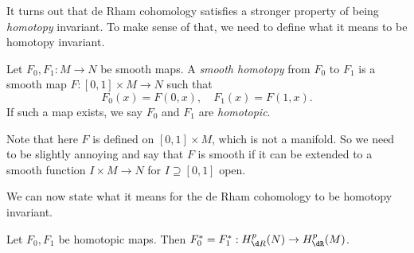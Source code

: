 \documentclass[a4paper]{article}
\begin{document}
It turns out that de Rham cohomology satisfies a stronger property of being \emph{homotopy} invariant. To make sense of that, we need to define what it means to be homotopy invariant.
\begin{defi}
  Let $F_0, F_1: M \to N$ be smooth maps. A \emph{smooth homotopy} from $F_0$ to $F_1$ is a smooth map $F: [0, 1] \times M \to N$ such that
  \[
    F_0(x) = F(0, x),\quad F_1(x) = F(1, x).
  \]
  If such a map exists, we say $F_0$ and $F_1$ are \emph{homotopic}.
\end{defi}
Note that here $F$ is defined on $[0, 1] \times M$, which is not a manifold. So we need to be slightly annoying and say that $F$ is smooth if it can be extended to a smooth function $I \times M \to N$ for $I \supseteq [0, 1]$ open.

We can now state what it means for the de Rham cohomology to be homotopy invariant.
\begin{thm}
  Let $F_0, F_1$ be homotopic maps. Then $F_0^* = F_1^*: H^p_{\d R}(N) \to H_{\dR}^p(M)$.
\end{thm}
\end{document}
